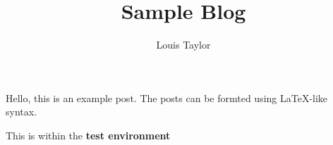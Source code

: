 \title{Sample Blog}
\author{Louis Taylor}
\maketitle

    Hello, this is an example post. The posts can be formted using LaTeX-like
    syntax.

    \begin{test}
        This is within the \bf{test} environment
    \end{test}
